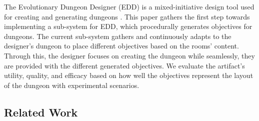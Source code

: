 
The Evolutionary Dungeon Designer (EDD) is a mixed-initiative design tool used for creating and generating dungeons . This paper gathers the first step towards implementing a sub-system for EDD, which procedurally generates objectives for dungeons. The current sub-system gathers and continuously adapts to the designer's dungeon to place different objectives based on the rooms' content. Through this, the designer focuses on creating the dungeon while seamlessly, they are provided with the different generated objectives. We evaluate the artifact's utility, quality, and efficacy based on how well the objectives represent the layout of the dungeon with experimental scenarios. 



\subsection{Related Work}
